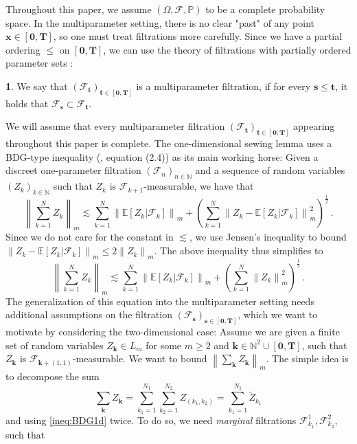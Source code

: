 \documentclass[11pt,oneside,english,reqno]{amsart}
\numberwithin{equation}{section}
\numberwithin{figure}{section}
\theoremstyle{plain}
\theoremstyle{definition}
\newtheorem{defn}[thm]{\protect\definitionname}
\theoremstyle{remark}
\theoremstyle{plain}
\theoremstyle{plain}
\theoremstyle{plain}
\theoremstyle{plain}
\theoremstyle{plain}
\providecommand{\definitionname}{Definition}
\newcommand{\cF}{\mathcal{F}}
\newcommand{\EE}{\mathbb{E}}
\newcommand{\NN}{\mathbb{N}}
\newcommand{\PP}{\mathbb{P}}
\newcommand{\bk}{\mathbf{k}}
\newcommand{\bT}{\mathbf{T}}
\newcommand{\bx}{\mathbf{x}}
\newcommand{\boo}{\mathbf{0}}
\newcommand{\bs}{\mathbf{s}}
\newcommand{\bt}{\mathbf{t}}
\newcommand{\norm}[1]{\left\lVert #1\right\rVert}
\begin{document}
Throughout this paper, we assume $(\Omega,\cF,\PP)$ to be a complete probability space. In the multiparameter setting, there is no clear "past" of any point $\bx\in[\boo,\bT]$, so one must treat filtrations more carefully. Since we have a partial ordering $\le$ on $[\boo,\bT]$, we can use the theory of filtrations with partially ordered parameter sets \cite{Walsh86}:
%
\begin{defn}\label{def:multiparameter_filtration}
    We say that $(\mathcal F_\bt)_{\bt\in[\boo,\bT]}$ is a multiparameter filtration, if for every $\bs\le\bt$, it holds that $\cF_\bs\subset\cF_\bt$.
\end{defn}
%
\noindent We will assume that every multiparameter filtration $(\cF_\bt)_{\bt\in[\boo,\bT]}$ appearing throughout this paper is complete. The one-dimensional sewing lemma uses a BDG-type inequality (\cite{Le20}, equation (2.4)) as its main working horse: Given a discreet one-parameter filtration $(\cF_n)_{n\in\NN}$ and a sequence of random variables $(Z_k)_{k\in\NN}$ such that $Z_k$ is $\cF_{k+1}$-measurable, we have that
%
\begin{equation*}
    \norm{\sum_{k=1}^N Z_k}_m\lesssim \sum_{k=1}^N \norm{\EE[Z_k\vert\cF_k]}_m + \left(\sum_{k=1}^N \norm{Z_k-\EE[Z_k\vert\cF_k]}_m^2\right)^{\frac 12}\,.
\end{equation*}
%
Since we do not care for the constant in $\lesssim$, we use Jensen's inequality to bound $\norm{Z_k-\EE[Z_k\vert\cF_k]}_m\le 2\norm{Z_k}_m$. The above inequality thus simplifies to
%
\begin{equation}\label{ineq:BDG1d}
    \norm{\sum_{k=1}^N Z_k}_m\lesssim \sum_{k=1}^N \norm{\EE[Z_k\vert\cF_k]}_m + \left(\sum_{k=1}^N \norm{Z_k}_m^2\right)^{\frac 12}\,.
\end{equation}
%
The generalization of this equation into the multiparameter setting needs additional assumptions on the filtration $(\cF_\bs)_{\bs\in[\boo,\bT]}$, which we want to motivate by considering the two-dimensional case: Assume we are given a finite set of random variables $Z_{\bk}\in L_m$ for some $m\ge 2$ and $\bk\in\NN^2\cup[\boo,\bT]$, such that $Z_{\bk}$ is $\cF_{\bk+(1,1)}$-measurable. We want to bound $\norm{\sum_{\bk} Z_\bk}_m$. The simple idea is to decompose the sum
%
\begin{equation}\label{eq:Z_K_decomposition}
    \sum_{\bk} Z_\bk = \sum_{k_1=1}^{N_1}\sum_{k_2=1}^{N_2} Z_{(k_1,k_2)} = \sum_{k_1 = 1}^{N_1} \tilde Z_{k_1}
\end{equation}
%
and using \eqref{ineq:BDG1d} twice. To do so, we need \emph{marginal} filtrations $\cF_{k_1}^1,\cF_{k_2}^2$, such that
\end{document}
